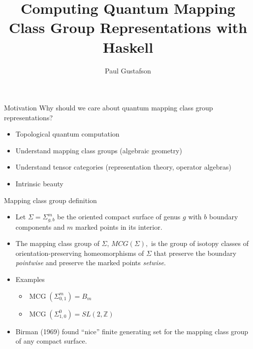 \documentclass{beamer}
\title{Computing Quantum Mapping Class Group Representations with Haskell}
\date{Paul Gustafson}
\DeclareMathOperator{\MCG}{MCG}
\begin{document}
\frame{\titlepage}

\begin{frame}{Motivation}
Why should we care about quantum mapping class group representations?
\begin{itemize}
\item Topological quantum computation
\vfill
\item Understand mapping class groups  (algebraic geometry)
\vfill
\item Understand tensor categories (representation theory, operator algebras)
\vfill
\item Intrinsic beauty

\end{itemize}
\end{frame}

\begin{frame}{Mapping class group definition}
\begin{itemize}
\item
    Let $\Sigma = \Sigma_{g,b}^m$ be the oriented compact surface of genus $g$ with $b$ boundary components and $m$ marked points in its interior.

    \pause
\item
   The mapping class group of $\Sigma$, 
   $MCG(\Sigma),$
   is the group of isotopy classes of orientation-preserving homeomorphisms of $\Sigma$ that preserve the boundary \emph{pointwise} and preserve the marked points \emph{setwise}.
  
  \pause
  \item Examples
  \begin{itemize}
    \item $\MCG(\Sigma_{0,1}^m) = B_m$
    \item $\MCG(\Sigma_{1,0}^0) = SL(2,\mathbb Z)$
  \end{itemize}

\pause

  \item Birman (1969) found ``nice'' finite generating set for the mapping class group of any compact surface.
\end{itemize}
\end{frame}
\end{document}
